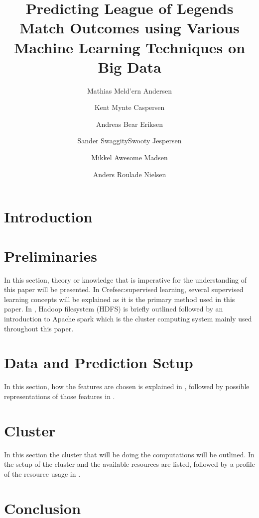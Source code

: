 \documentclass[columns=,boxcolor=white]{datart}
\title{Predicting League of Legends Match Outcomes using Various Machine Learning Techniques on Big Data}
\date{}
\author{Mathias Meld'ern Andersen}
\author{Kent Mynte Caspersen}
\author{Andreas Bear Eriksen}
\author{Sander SwaggitySwooty Jespersen}
\author{Mikkel Awesome Madsen}
\author{Anders Roulade Nielsen}
\affil{Department of Computer Science, Aalborg University}
\begin{document}
\usetikzlibrary{arrows,intersections,shapes.geometric,calc}
\maketitle



\section{Introduction}\label{sec:intro}





\section{Preliminaries}\label{sec:prelim}
In this section, theory or knowledge that is imperative for the understanding of this paper will be presented. In Cref{sec:supervised learning}, several supervised learning concepts will be explained as it is the primary method used in this paper. In , Hadoop filesystem (HDFS) is briefly outlined followed by an introduction to Apache spark which is the cluster computing system mainly used throughout this paper.




\section{Data and Prediction Setup}\label{sec:features}
In this section, how the features are chosen is explained in , followed by possible representations of those features in . 




\section{Cluster}\label{sec:cluster}
In this section the cluster that will be doing the computations will be outlined. In  the setup of the cluster and the available resources are listed, followed by a profile of the resource usage in .











\section{Conclusion}





\newpage
\appendix

%
%
\end{document}
